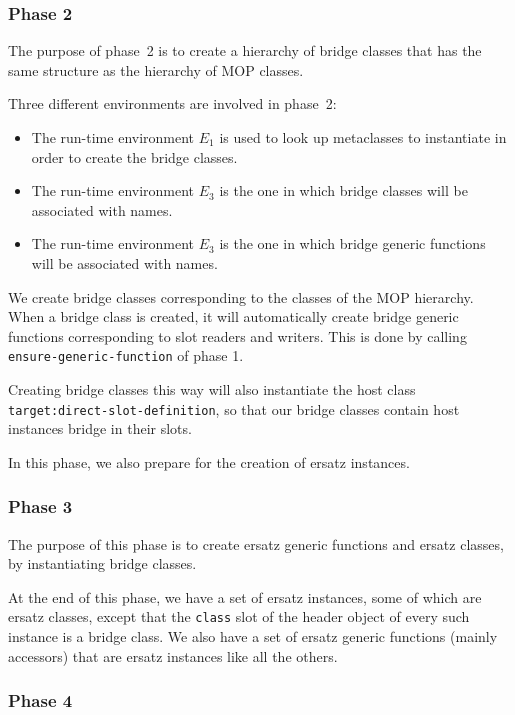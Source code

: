 \subsubsection{Phase 2}

The purpose of phase~2 is to create a hierarchy of bridge classes that
has the same structure as the hierarchy of MOP classes.

Three different environments are involved in phase~2:

\begin{itemize}
\item The run-time environment $E_1$ is used to look up metaclasses to
  instantiate in order to create the bridge classes.
\item The run-time environment $E_3$ is the one in which bridge
  classes will be associated with names.
\item The run-time environment $E_3$ is the one in which bridge
  generic functions will be associated with names.
\end{itemize}

We create bridge classes corresponding to the classes of the MOP
hierarchy.  When a bridge class is created, it will automatically
create bridge generic functions corresponding to slot readers and
writers.  This is done by calling \texttt{ensure-generic-function} of
phase 1.

Creating bridge classes this way will also instantiate the host class
\texttt{target:direct-slot-definition}, so that our bridge classes
contain host instances bridge in their slots. 

In this phase, we also prepare for the creation of ersatz instances.

\subsubsection{Phase 3}

The purpose of this phase is to create ersatz generic functions and
ersatz classes, by instantiating bridge classes.  

At the end of this phase, we have a set of ersatz instances, some of
which are ersatz classes, except that the \texttt{class} slot of the
header object of every such instance is a bridge class.  We also have
a set of ersatz generic functions (mainly accessors) that are ersatz
instances like all the others. 

\subsubsection{Phase 4}

